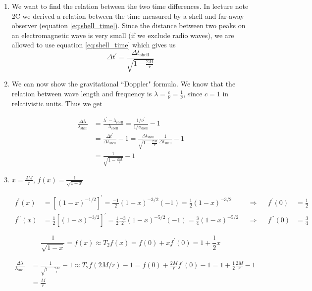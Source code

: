 \documentclass[a4paper,10pt,english]{article}
\begin{document}
\begin{enumerate}

\item We want to find the relation between the two time differences. In lecture note 2C we derived a relation between the time measured by a shell and far-away observer (equation \ref{eq:shell_time}).
Since the distance between two peaks on an electromagnetic wave is very small (if we exclude radio waves), we are allowed to use equation \ref{eq:shell_time} which gives us \[\Delta t^{\prime}=\frac{\Delta t_{\text{shell}}}{\sqrt{1-\frac{2M}{r}}}\]

\item We can now show the gravitational ``Doppler" formula. We know that the relation between wave length and frequency is $\lambda=\frac{c}{\nu}=\frac{1}{\nu}$, since $c=1$ in relativistic units. Thus we get

\begin{align*}
\frac{\Delta \lambda}{\lambda_{\text{shell}}}&=\frac{\lambda^{\prime}-\lambda_{\text{shell}}}{\lambda_{\text{shell}}}=\frac{1/\nu^{\prime}}{1/\nu_{\text{shell}}}-1\\
&=\frac{\Delta t^{\prime}}{\Delta t_{\text{shell}}}-1=\frac{\Delta t_{\text{shell}}}{\sqrt{1-\frac{2M}{r}}}\frac{1}{\Delta t_{\text{shell}}}-1\\
&=\frac{1}{\sqrt{1-\frac{2M}{r}}}-1
\end{align*}
  
\item $x=\frac{2M}{r}$, $f(x)=\frac{1}{\sqrt{1-x}}$

\begin{align*}
f^{\prime}(x)&=\left[(1-x)^{-1/2}\right]^{\prime}=\frac{-1}{2}(1-x)^{-3/2}(-1)=\frac{1}{2}(1-x)^{-3/2} &&\Rightarrow&& f^{\prime}(0)&=\frac{1}{2}\\
f^{\prime\prime}(x)&=\frac{1}{2}\left[(1-x)^{-3/2}\right]^{\prime}=\frac{1}{2}\frac{-3}{2}(1-x)^{-5/2}(-1)=\frac{3}{4}(1-x)^{-5/2} &&\Rightarrow&& f^{\prime\prime}(0)&=\frac{3}{4}
\end{align*}  

\begin{equation*}
\frac{1}{\sqrt{1-x}}=f(x)\approx T_{2}f(x)=f(0)+xf^{\prime}(0)=1+\frac{1}{2}x
\end{equation*}

\begin{align*}
\frac{\Delta \lambda}{\lambda_{\text{shell}}}&=\frac{1}{\sqrt{1-\frac{2M}{r}}}-1\approx T_{2}f(2M/r)-1=f(0)+\frac{2M}{r}f^{\prime}(0)-1=1+\frac{1}{2}\frac{2M}{r}-1\\
&=\frac{M}{r}
\end{align*}



\end{enumerate}
\end{document}
